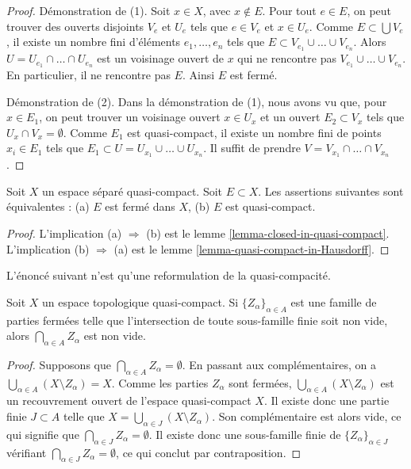 \begin{proof}
Démonstration de (1). Soit $x \in X$, avec $x \not \in E$.
Pour tout $e \in E$, on peut trouver des ouverts disjoints $V_e$ et $U_e$
tels que $e \in V_e$ et $x \in U_e$. Comme $E \subset \bigcup V_e$, il
existe un nombre fini d'éléments $e_1, \ldots, e_n$ tels que
$E \subset V_{e_1} \cup \ldots \cup V_{e_n}$. Alors
$U = U_{e_1} \cap \ldots \cap U_{e_n}$ est un voisinage ouvert de $x$ qui ne
rencontre pas $V_{e_1} \cup \ldots \cup V_{e_n}$. En particulier, il ne
rencontre pas $E$. Ainsi $E$ est fermé.

\medskip\noindent
Démonstration de (2). Dans la démonstration de (1), nous avons vu que, pour
$x \in E_1$, on peut trouver un voisinage ouvert $x \in U_x$ et un ouvert
$E_2 \subset V_x$ tels que $U_x \cap V_x = \emptyset$. Comme $E_1$ est
quasi-compact, il existe un nombre fini de points $x_i \in E_1$ tels que
$E_1 \subset U = U_{x_1} \cup \ldots \cup U_{x_n}$.
Il suffit de prendre $V = V_{x_1} \cap \ldots \cap V_{x_n}$.
\end{proof}

\begin{lemma}
\label{lemma-closed-in-compact}
Soit $X$ un espace séparé quasi-compact. Soit $E \subset X$.
Les assertions suivantes sont équivalentes : (a) $E$ est fermé dans $X$,
(b) $E$ est quasi-compact.
\end{lemma}

\begin{proof}
L'implication (a) $\Rightarrow$ (b) est le
lemme \ref{lemma-closed-in-quasi-compact}.
L'implication (b) $\Rightarrow$ (a) est le
lemme \ref{lemma-quasi-compact-in-Hausdorff}.
\end{proof}

\noindent
L'énoncé suivant n'est qu'une reformulation de la quasi-compacité.

\begin{lemma}
\label{lemma-intersection-closed-in-quasi-compact}
Soit $X$ un espace topologique quasi-compact.
Si $\{Z_\alpha\}_{\alpha \in A}$ est une famille de parties fermées telle que
l'intersection de toute sous-famille finie soit non vide, alors
$\bigcap_{\alpha \in A} Z_\alpha$ est non vide.
\end{lemma}

\begin{proof}
Supposons que $\bigcap_{\alpha \in A} Z_{\alpha} = \emptyset$.
En passant aux complémentaires, on a
$\bigcup_{\alpha \in A} (X\setminus Z_{\alpha})=X$.
Comme les parties $Z_\alpha$ sont fermées,
$\bigcup_{\alpha \in A} (X \setminus Z_{\alpha})$ est un recouvrement ouvert
de l'espace quasi-compact $X$. Il existe donc une partie finie $J \subset A$
telle que $X = \bigcup_{\alpha \in J} (X\setminus Z_{\alpha})$.
Son complémentaire est alors vide, ce qui signifie que
$\bigcap_{\alpha \in J} Z_{\alpha} = \emptyset$. Il existe donc une
sous-famille finie de $\{Z_{\alpha}\}_{\alpha \in J}$ vérifiant
$\bigcap_{\alpha \in J} Z_{\alpha}=\emptyset$, ce qui conclut par
contraposition.
\end{proof}

